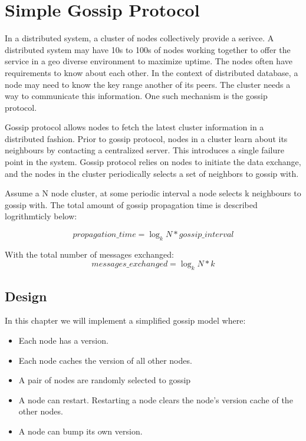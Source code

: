 % 


\chapter{Simple Gossip Protocol}

In a distributed system, a cluster of nodes collectively provide a serivce. A
distributed system may have 10s to 100s of nodes working together to offer the
service in a geo diverse environment to maximize uptime. The nodes often
have requirements to know about each other. In the context of distributed
database, a node may need to know the key range another of its peers. The
cluster needs a way to communicate this information. One such mechanism is the
gossip protocol.\newline

Gossip protocol allows nodes to fetch the latest cluster information in a
distributed fashion. Prior to gossip protocol, nodes in a cluster learn about
its neighbours by contacting a centralized server. This introduces a single
failure point in the system. Gossip protocol relies on nodes to initiate 
the data exchange, and the nodes in the cluster periodically selects a set of neighbors to
gossip with. \newline

Assume a N node cluster, at some periodic interval a node selects k neighbours
to gossip with. The total amount of gossip propagation time is described
logrithmticly below:

\begin{equation} 
    propagation\_time = \log_k N * gossip\_interval
\end{equation}

With the total number of messages exchanged: 
\begin{equation} 
    messages\_exchanged = \log_k N * k
\end{equation}

\section{Design}

In this chapter we will implement a simplified gossip model where: 
\begin{itemize}
    \item Each node has a version.
    \item Each node caches the version of all other nodes.
    \item A pair of nodes are randomly selected to gossip 
    \item A node can restart. Restarting a node clears the node's version cache
    of the other nodes.
    \item A node can bump its own version.
\end{itemize}

